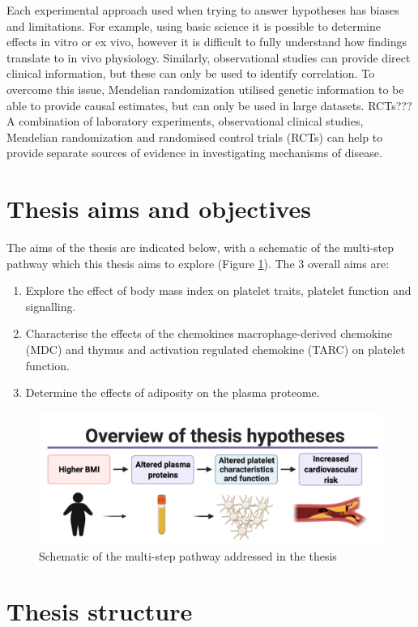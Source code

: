 \documentclass[11pt,twoside]{bristolthesis}
\providecommand{\tightlist}{%
  \setlength{\itemsep}{0pt}\setlength{\parskip}{0pt}}
\begin{document}
Each experimental approach used when trying to answer hypotheses has biases and limitations. For example, using basic science it is possible to determine effects in vitro or ex vivo, however it is difficult to fully understand how findings translate to in vivo physiology. Similarly, observational studies can provide direct clinical information, but these can only be used to identify correlation. To overcome this issue, Mendelian randomization utilised genetic information to be able to provide causal estimates, but can only be used in large datasets. RCTs???
A combination of laboratory experiments, observational clinical studies, Mendelian randomization and randomised control trials (RCTs) can help to provide separate sources of evidence in investigating mechanisms of disease.

\hypertarget{thesis-aims-and-objectives}{%
\section{Thesis aims and objectives}\label{thesis-aims-and-objectives}}

The aims of the thesis are indicated below, with a schematic of the multi-step pathway which this thesis aims to explore (Figure \ref{fig:Thesis-schematic}). The 3 overall aims are:
\begin{enumerate}
\def\labelenumi{\arabic{enumi})}
\tightlist
\item
  Explore the effect of body mass index on platelet traits, platelet function and signalling.
\item
  Characterise the effects of the chemokines macrophage-derived chemokine (MDC) and thymus and activation regulated chemokine (TARC) on platelet function.
\item
  Determine the effects of adiposity on the plasma proteome.
\end{enumerate}
\begin{figure}
\includegraphics{figure/Intro_background/Thesis_graphic_overview_without_chapters} \caption[Schematic of the multi-step pathway addressed in the thesis]{Schematic of the multi-step pathway addressed in the thesis}\label{fig:Thesis-schematic}
\end{figure}
\hypertarget{thesis-structure}{%
\section{Thesis structure}\label{thesis-structure}}
\end{document}
